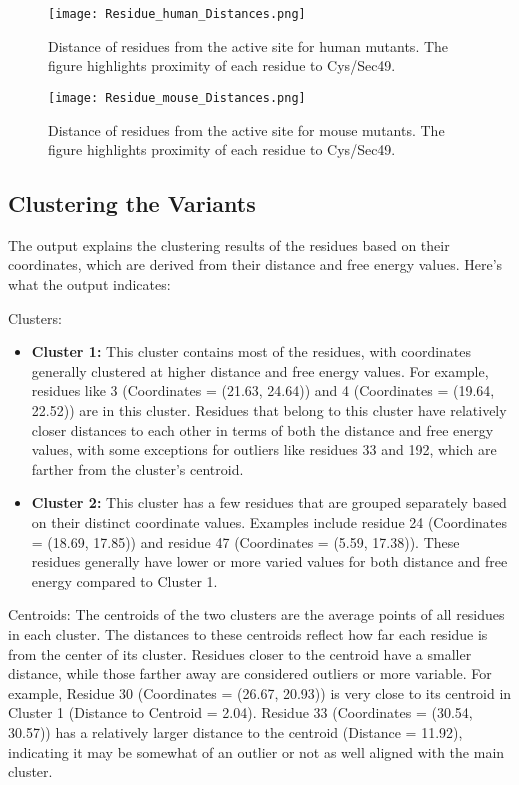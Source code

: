 \documentclass{article}
\begin{document}
\begin{figure}[H]
    \centering
    \texttt{[image: Residue\_human\_Distances.png]}
    \caption{Distance of residues from the active site for human mutants. The figure highlights proximity of each residue to Cys/Sec49.}
    \label{fig:human_distances}
\end{figure}

\begin{figure}[H]
    \centering
    \texttt{[image: Residue\_mouse\_Distances.png]}
    \caption{Distance of residues from the active site for mouse mutants. The figure highlights proximity of each residue to Cys/Sec49.}
    \label{fig:mouse_distances}
\end{figure}

\FloatBarrier %

\subsection{Clustering the Variants}
The output explains the clustering results of the residues based on their coordinates, which are derived from their distance and free energy values. Here's what the output indicates:

Clusters:
\begin{itemize}
    \item \textbf{Cluster 1:} This cluster contains most of the residues, with coordinates generally clustered at higher distance and free energy values. For example, residues like 3 (Coordinates = (21.63, 24.64)) and 4 (Coordinates = (19.64, 22.52)) are in this cluster. Residues that belong to this cluster have relatively closer distances to each other in terms of both the distance and free energy values, with some exceptions for outliers like residues 33 and 192, which are farther from the cluster's centroid.
    \item \textbf{Cluster 2:} This cluster has a few residues that are grouped separately based on their distinct coordinate values. Examples include residue 24 (Coordinates = (18.69, 17.85)) and residue 47 (Coordinates = (5.59, 17.38)). These residues generally have lower or more varied values for both distance and free energy compared to Cluster 1.
\end{itemize}

Centroids: The centroids of the two clusters are the average points of all residues in each cluster. The distances to these centroids reflect how far each residue is from the center of its cluster. Residues closer to the centroid have a smaller distance, while those farther away are considered outliers or more variable. For example, Residue 30 (Coordinates = (26.67, 20.93)) is very close to its centroid in Cluster 1 (Distance to Centroid = 2.04). Residue 33 (Coordinates = (30.54, 30.57)) has a relatively larger distance to the centroid (Distance = 11.92), indicating it may be somewhat of an outlier or not as well aligned with the main cluster.
\end{document}
